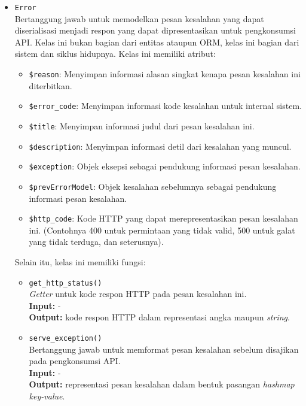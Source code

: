 \begin{itemize}
        \item \texttt{Error} \\
            Bertanggung jawab untuk memodelkan pesan kesalahan yang dapat diserialisasi menjadi respon
            yang dapat dipresentasikan untuk pengkonsumsi API. Kelas ini bukan bagian dari entitas
            ataupun ORM, kelas ini bagian dari sistem dan siklus hidupnya. Kelas ini memiliki
            atribut:
            \begin{itemize}
                \item \texttt{\$reason}: Menyimpan informasi alasan singkat kenapa pesan kesalahan 
                    ini diterbitkan.
                \item \texttt{\$error\_code}: Menyimpan informasi kode kesalahan untuk internal sistem.
                \item \texttt{\$title}: Menyimpan informasi judul dari pesan kesalahan ini.
                \item \texttt{\$description}: Menyimpan informasi detil dari kesalahan yang muncul.
                \item \texttt{\$exception}: Objek eksepsi sebagai pendukung informasi pesan kesalahan.
                \item \texttt{\$prevErrorModel}: Objek kesalahan sebelumnya sebagai pendukung informasi
                    pesan kesalahan.
                \item \texttt{\$http\_code}: Kode HTTP yang dapat merepresentasikan pesan kesalahan
                    ini. (Contohnya 400 untuk permintaan yang tidak valid, 500 untuk galat yang
                    tidak terduga, dan seterusnya).
            \end{itemize}
            Selain itu, kelas ini memiliki fungsi:
            \begin{itemize}
                \item \texttt{get\_http\_status()} \\
                    \textit{Getter} untuk kode respon HTTP pada pesan kesalahan ini. \\
                    \textbf{Input:} - \\
                    \textbf{Output:} kode respon HTTP dalam representasi angka maupun 
                        \textit{string}.
                    
                \item \texttt{serve\_exception()} \\
                    Bertanggung jawab untuk memformat pesan kesalahan sebelum disajikan pada
                    pengkonsumsi API. \\
                    \textbf{Input:} - \\
                    \textbf{Output:} representasi pesan kesalahan dalam bentuk pasangan 
                        \textit{hashmap key-value}.
            \end{itemize}
                

\end{itemize}
